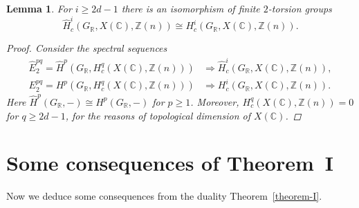 \documentclass[leqno,12pt]{article}
\theoremstyle{plain}
\newtheorem{lemma}[theorem]{\indent\sc Lemma}
\theoremstyle{definition}
\newcommand{\CC}{\mathbb{C}}
\newcommand{\RR}{\mathbb{R}}
\newcommand{\ZZ}{\mathbb{Z}}
\begin{document}
\begin{lemma}
  \label{lemma:Tate-vs-normal-cohomology-of-X(C)}
  For $i \ge 2d - 1$ there is an isomorphism of finite $2$-torsion groups
  \[ \widehat{H}^i_c (G_\RR, X (\CC), \ZZ(n)) \cong
    H^i_c (G_\RR, X (\CC), \ZZ(n)). \]

  \begin{proof}
    Consider the spectral sequences
    \begin{align*}
      \widehat{E}^{pq}_2 = \widehat{H}^p (G_\RR, H^q_c (X (\CC), \ZZ(n))) & \Longrightarrow
      \widehat{H}^i_c (G_\RR, X (\CC), \ZZ(n)), \\
      E^{pq}_2 = H^p (G_\RR, H^q_c (X (\CC), \ZZ(n))) & \Longrightarrow
      H^i_c (G_\RR, X (\CC), \ZZ(n)).
    \end{align*}
    Here $\widehat{H}^p (G_\RR, -) \cong H^p (G_\RR, -)$ for
    $p \ge 1$. Moreover, $H^q_c (X (\CC), \ZZ(n)) = 0$ for $q \ge 2d-1$, for
    the reasons of topological dimension of $X (\CC)$.
  \end{proof}
\end{lemma}


\section{Some consequences of Theorem~I}
\label{sec:consequences-of-theorem-I}

Now we deduce some consequences from the duality Theorem~\ref{theorem-I}.
\end{document}
